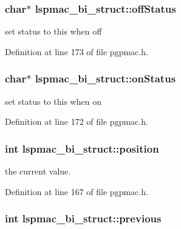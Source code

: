 \hypertarget{structlspmac__bi__struct_a34564b9372303ed2f1d0758ff5a3fcd8}{
\subsubsection[{off\-Status}]{\setlength{\rightskip}{0pt plus 5cm}char$\ast$ lspmac\-\_\-bi\-\_\-struct\-::off\-Status}}\label{structlspmac__bi__struct_a34564b9372303ed2f1d0758ff5a3fcd8}


set status to this when off 



Definition at line 173 of file pgpmac.\-h.

\hypertarget{structlspmac__bi__struct_a160aaae81ca309bcac3719a595a19f75}{
\subsubsection[{on\-Status}]{\setlength{\rightskip}{0pt plus 5cm}char$\ast$ lspmac\-\_\-bi\-\_\-struct\-::on\-Status}}\label{structlspmac__bi__struct_a160aaae81ca309bcac3719a595a19f75}


set status to this when on 



Definition at line 172 of file pgpmac.\-h.

\hypertarget{structlspmac__bi__struct_a76c4627028b86141c101f1764bebb7b0}{
\subsubsection[{position}]{\setlength{\rightskip}{0pt plus 5cm}int lspmac\-\_\-bi\-\_\-struct\-::position}}\label{structlspmac__bi__struct_a76c4627028b86141c101f1764bebb7b0}


the current value. 



Definition at line 167 of file pgpmac.\-h.

\hypertarget{structlspmac__bi__struct_a00f09cb3d7bdbe1058fb56bb8c2b0fa3}{
\subsubsection[{previous}]{\setlength{\rightskip}{0pt plus 5cm}int lspmac\-\_\-bi\-\_\-struct\-::previous}}\label{structlspmac__bi__struct_a00f09cb3d7bdbe1058fb56bb8c2b0fa3}


